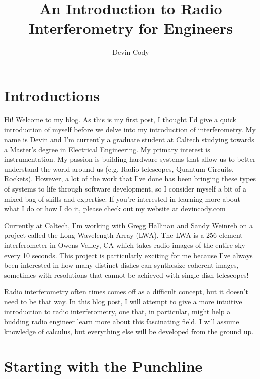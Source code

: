 \documentclass[12pt,a4paper]{article}
\author{Devin Cody}
\title{An Introduction to Radio Interferometry for Engineers}
\begin{document}
\maketitle

\section{Introductions}

Hi! Welcome to my blog. As this is my first post, I thought I’d give a quick introduction of myself before we delve into my introduction of interferometry. My name is Devin and I’m currently a graduate student at Caltech studying towards a Master’s degree in Electrical Engineering. My primary interest is instrumentation. My passion is building hardware systems that allow us to better understand the world around us (e.g. Radio telescopes, Quantum Circuits, Rockets). However, a lot of the work that I’ve done has been bringing these types of systems to life through software development, so I consider myself a bit of a mixed bag of skills and expertise.  If you’re interested in learning more about what I do or how I do it, please check out my website at devincody.com

Currently at Caltech, I’m working with Gregg Hallinan and Sandy Weinreb on a project called the Long Wavelength Array (LWA). The LWA is a 256-element interferometer in Owens Valley, CA which takes radio images of the entire sky every 10 seconds. This project is particularly exciting for me because I’ve always been interested in how many distinct dishes can synthesize coherent images, sometimes with resolutions that cannot be achieved with single dish telescopes!

Radio interferometry often times comes off as a difficult concept, but it doesn’t need to be that way. In this blog post, I will attempt to give a more intuitive introduction to radio interferometry, one that, in particular, might help a budding radio engineer learn more about this fascinating field. I will assume knowledge of calculus, but everything else will be developed from the ground up. 

	
\section{Starting with the Punchline}
	
\end{document}
